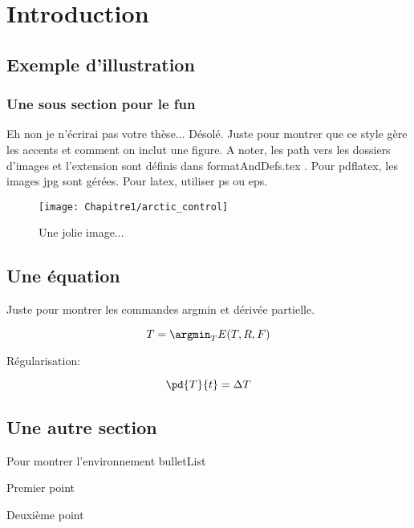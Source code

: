\chapter{Introduction}
\label{chap:intro}
\minitoc

\section{Exemple d'illustration}

\subsection{Une sous section pour le fun}

Eh non je n'écrirai pas votre thèse... Désolé. Juste pour montrer que ce style gère les accents et comment on inclut une figure. A noter, les path vers les dossiers d'images et l'extension sont définis dans formatAndDefs.tex . Pour pdflatex, les images jpg sont gérées. Pour latex, utiliser ps ou eps.

\begin{figure}[!htbp]
  \begin{center}
    \texttt{[image: Chapitre1/arctic\_control]}
  \end{center}
  \caption{Une jolie image...}
  \label{fig:jolieImage}
\end{figure}

\section{Une équation}

Juste pour montrer les commandes argmin et dérivée partielle.

\begin{equation}
  T = \argmin_T E(T,R,F)
\end{equation}

Régularisation:

\begin{equation}
  \pd{T}{t} = \Delta T
\end{equation}

\section{Une autre section}

Pour montrer l'environnement bulletList

\begin{bulletList}
 \item Premier point
 \item Deuxième point
\end{bulletList}

